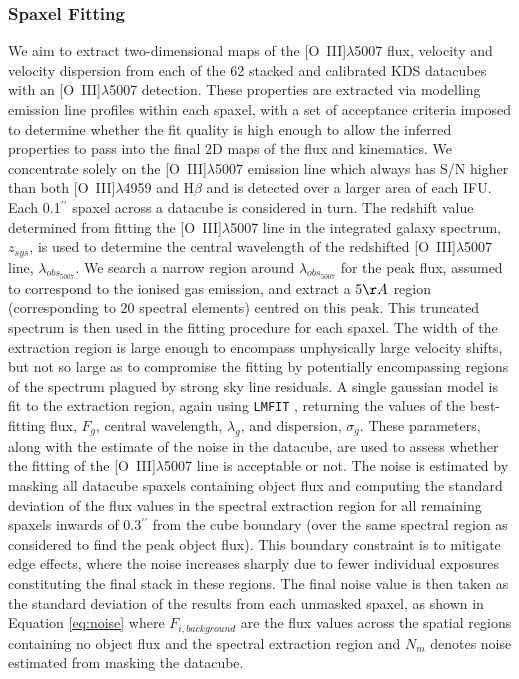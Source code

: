 \documentclass[fleqn,usenatbib]{mn2e}
\begin{document}
\subsubsection{Spaxel Fitting}\label{subsubsection:spaxel_fitting}
We aim to extract two-dimensional maps of the [O~{\sc III}]$\lambda$5007 flux, velocity and velocity dispersion from each of the 62 stacked and calibrated KDS datacubes with an [O~{\sc III}]$\lambda$5007 detection.
These properties are extracted via modelling emission line profiles within each spaxel, with a set of acceptance criteria imposed to determine whether the fit quality is high enough to allow the inferred properties to pass into the final 2D maps of the flux and kinematics.
We concentrate solely on the [O~{\sc III}]$\lambda$5007 emission line which always has S/N higher than both [O~{\sc III}]$\lambda$4959 and H$\beta$ and is detected over a larger area of each IFU. \\

Each 0.1$^{\prime\prime}$ spaxel across a datacube is considered in turn.
The redshift value determined from fitting the [O~{\sc III}]$\lambda$5007 line in the integrated galaxy spectrum, $z_{sys}$, is used to determine the central wavelength of the redshifted [O~{\sc III}]$\lambda$5007 line, $\lambda_{obs_{5007}}$. 
We search a narrow region around $\lambda_{obs_{5007}}$ for the peak flux, assumed to correspond to the ionised gas emission, and extract a 5$\AA$ region (corresponding to 20 spectral elements) centred on this peak.
This truncated spectrum is then used in the fitting procedure for each spaxel.
The width of the extraction region is large enough to encompass unphysically large velocity shifts, but not so large as to compromise the fitting by potentially encompassing regions of the spectrum plagued by strong sky line residuals.
A single gaussian model is fit to the extraction region, again using {\tt LMFIT} \citep{Newville2014}, returning the values of the best-fitting flux, $F_{g}$, central wavelength, $\lambda_{g}$, and dispersion, $\sigma_{g}$.
These parameters, along with the estimate of the noise in the datacube, are used to assess whether the fitting of the [O~{\sc III}]$\lambda$5007 line is acceptable or not. 
The noise is estimated by masking all datacube spaxels containing object flux and computing the standard deviation of the flux values in the spectral extraction region for all remaining spaxels inwards of 0.3$^{\prime\prime}$ from the cube boundary (over the same spectral region as considered to find the peak object flux).
This boundary constraint is to mitigate edge effects, where the noise increases sharply due to fewer individual exposures constituting the final stack in these regions.
The final noise value is then taken as the standard deviation of the results from each unmasked spaxel, as shown in Equation \ref{eq:noise} where $F_{i,background}$ are the flux values across the spatial regions containing no object flux and the spectral extraction region and $N_{m}$ denotes noise estimated from masking the datacube.
\end{document}
